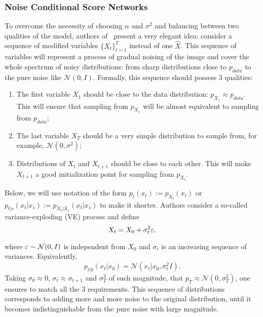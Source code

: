 \subsubsection{Noise Conditional Score Networks}
To overcome the necessity of choosing $\alpha$ and $\sigma^2$ and balancing between two qualities of the model, authors of~\cite{song2019generative} present a very elegant idea: consider a sequence of modified variables $\{X_t\}_{t = 1}^{T}$ instead of one $\hat{X}$. This sequence of variables will represent a process of gradual noising of the image and cover the whole spectrum of noisy distributions: from sharp distributions close to $p_{data}$ to the pure noise like $\mathcal{N}(0, I)$. Formally, this sequence should possess 3 qualities:
\begin{enumerate}
    \item The first variable $X_1$ should be close to the data distribution: $p_{X_1} \approx p_{data}$. This will ensure that sampling from $p_{X_1}$ will be almost equivalent to sampling from $p_{data}$;
    \item The last variable $X_T$ should be a very simple distribution to sample from, for example, $\mathcal{N}(0, \sigma^2)$;
    \item Distributions of $X_t$ and $X_{t + 1}$ should be close to each other. This will make $X_{t + 1}$ a good initialization point for sampling from $p_{X_t}$.
\end{enumerate}

Below, we will use notation of the form $p_t(x_t) := p_{X_t}(x_t)$ or $p_{t | s}(x_t | x_s) := p_{X_t | X_s}(x_t | x_s)$ to make it shorter. Authors consider a so-called variance-exploding (VE) process and define
\begin{equation}\label{eq:ve_process}
    X_t = X_0 + \sigma^2_t \varepsilon,    
\end{equation}

where $\varepsilon \sim \mathcal{N}(0, I)$ is independent from $X_0$ and $\sigma_t$ is an increasing sequence of variances. Equivalently,
\[
    p_{t | 0}(x_t | x_0) = \mathcal{N}(x_t | x_0, \sigma_t^2 I).
\]
Taking $\sigma_0 \approx 0$, $\sigma_{t} \approx \sigma_{t + 1}$ and $\sigma_{T}^2$ of such magnitude, that $p_{T} \approx \mathcal{N}(0, \sigma_T^2)$, one ensures to match all the 3 requirements. This sequence of distributions corresponds to adding more and more noise to the original distribution, until it becomes indistinguishable from the pure noise with large magnitude.

